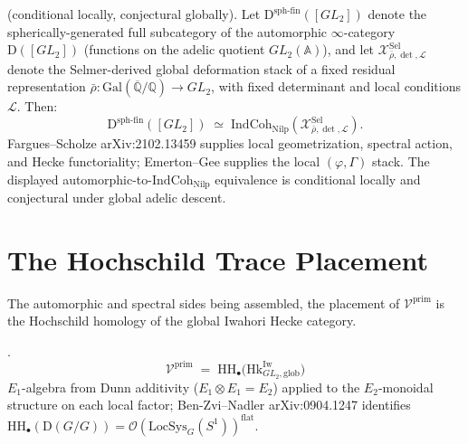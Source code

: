 \begin{theorem}
\label{v4-arith:thm:arithmetic-AG}
\ClaimStatusConjectured (conditional locally, conjectural
globally).
Let \(\mathrm{D}^{\mathrm{sph\text{-}fin}}([GL_{2}])\) denote the spherically-generated
full subcategory of the automorphic \(\infty\)-category \(\mathrm{D}([GL_{2}])\) (functions
on the adelic quotient \(GL_2(\mathbb{A})\)), and let
\(\mathcal{X}^{\mathrm{Sel}}_{\bar\rho,\det,\mathcal{L}}\) denote the Selmer-derived global
deformation stack of a fixed residual representation \(\bar\rho\colon \mathrm{Gal}(\overline{\mathbb{Q}}/\mathbb{Q})\to GL_2\),
with fixed determinant and local conditions \(\mathcal{L}\). Then:
\begin{equation}
\mathrm{D}^{\mathrm{sph\text{-}fin}}([GL_{2}])\;\simeq\;\mathrm{IndCoh}_{\mathrm{Nilp}}(\mathcal{X}^{\mathrm{Sel}}_{\bar\rho,\det,\mathcal{L}}).
\end{equation}
Fargues--Scholze arXiv:2102.13459 supplies local geometrization,
spectral action, and Hecke functoriality; Emerton--Gee
supplies the local \((\varphi,\Gamma)\) stack. The displayed
automorphic-to-\(\mathrm{IndCoh}_{\mathrm{Nilp}}\) equivalence is conditional
locally and conjectural under global adelic descent.
\end{theorem}

\section{The Hochschild Trace Placement}
\label{v4-arith:bb:hochschild-placement}

The automorphic and spectral sides being assembled, the placement of
\(\mathcal{V}^{\mathrm{prim}}\) is the Hochschild homology of the global
Iwahori Hecke category.

\begin{theorem}
\label{v4-arith:thm:crowning-placement}
\ClaimStatusConjectured.
\begin{equation}
\boxed{\;\mathcal{V}^{\mathrm{prim}}\;=\;\mathrm{HH}_{\bullet}\bigl(\mathrm{Hk}^{\mathrm{Iw}}_{GL_{2},\mathrm{glob}}\bigr)\;}
\end{equation}
\(E_{1}\)-algebra from Dunn additivity (\(E_{1}\otimes E_{1}=E_{2}\))
applied to the \(E_{2}\)-monoidal structure on each local factor;
Ben-Zvi--Nadler arXiv:0904.1247 identifies
\(\mathrm{HH}_{\bullet}(\mathrm{D}(G/G))=\mathcal{O}(\mathrm{LocSys}_{G}(S^{1}))^{\mathrm{flat}}\).
\end{theorem}

